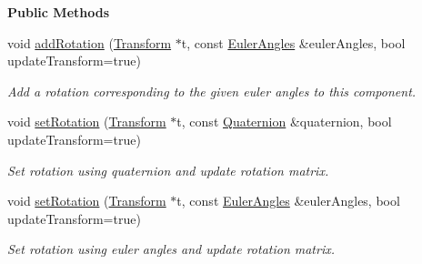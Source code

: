 \begin{Indent}\textbf{ Public Methods}\par
\begin{DoxyCompactItemize}
\item 
\mbox{\label{classrev_1_1_rotation_component_a3968e28d867dc9de0edcd0da3ae20885}} 
void \mbox{\hyperlink{classrev_1_1_rotation_component_a3968e28d867dc9de0edcd0da3ae20885}{add\+Rotation}} (\mbox{\hyperlink{classrev_1_1_transform}{Transform}} $\ast$t, const \mbox{\hyperlink{classrev_1_1_euler_angles}{Euler\+Angles}} \&euler\+Angles, bool update\+Transform=true)
\begin{DoxyCompactList}\small\item\em Add a rotation corresponding to the given euler angles to this component. \end{DoxyCompactList}\item 
\mbox{\label{classrev_1_1_rotation_component_a059d7641b2cc743b4fa4186a3705f3b4}} 
void \mbox{\hyperlink{classrev_1_1_rotation_component_a059d7641b2cc743b4fa4186a3705f3b4}{set\+Rotation}} (\mbox{\hyperlink{classrev_1_1_transform}{Transform}} $\ast$t, const \mbox{\hyperlink{classrev_1_1_quaternion}{Quaternion}} \&quaternion, bool update\+Transform=true)
\begin{DoxyCompactList}\small\item\em Set rotation using quaternion and update rotation matrix. \end{DoxyCompactList}\item 
\mbox{\label{classrev_1_1_rotation_component_ad033419a98f8d6cd4dd4da0f3c758edb}} 
void \mbox{\hyperlink{classrev_1_1_rotation_component_ad033419a98f8d6cd4dd4da0f3c758edb}{set\+Rotation}} (\mbox{\hyperlink{classrev_1_1_transform}{Transform}} $\ast$t, const \mbox{\hyperlink{classrev_1_1_euler_angles}{Euler\+Angles}} \&euler\+Angles, bool update\+Transform=true)
\begin{DoxyCompactList}\small\item\em Set rotation using euler angles and update rotation matrix. \end{DoxyCompactList}\end{DoxyCompactItemize}
\end{Indent}

